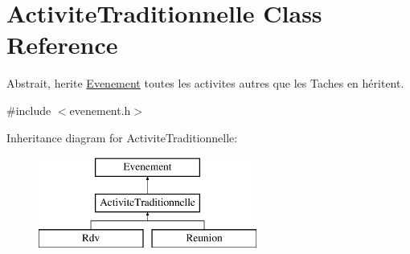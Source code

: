 \hypertarget{class_activite_traditionnelle}{}\section{Activite\+Traditionnelle Class Reference}
\label{class_activite_traditionnelle}


Abstrait, herite \hyperlink{class_evenement}{Evenement} toutes les activites autres que les Taches en héritent.  




{\ttfamily \#include $<$evenement.\+h$>$}

Inheritance diagram for Activite\+Traditionnelle\+:\begin{figure}[H]
\begin{center}
\leavevmode
\includegraphics[height=3.000000cm]{class_activite_traditionnelle}
\end{center}
\end{figure}

